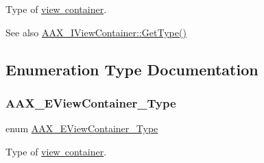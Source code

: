 Type of \mbox{\hyperlink{a01889}{view container}}. 

\begin{DoxySeeAlso}{See also}
\mbox{\hyperlink{a01889_a1715c042ed8412a2135f4d9e5109e8fb}{A\+A\+X\+\_\+\+I\+View\+Container\+::\+Get\+Type()}} 
\end{DoxySeeAlso}


\subsection{Enumeration Type Documentation}
\mbox{\label{a00503_a89d5cb8c7fdb11f34e695fb0e057b764}} 
\subsubsection{\texorpdfstring{AAX\_EViewContainer\_Type}{AAX\_EViewContainer\_Type}}
{\footnotesize\ttfamily enum \mbox{\hyperlink{a00503_a89d5cb8c7fdb11f34e695fb0e057b764}{A\+A\+X\+\_\+\+E\+View\+Container\+\_\+\+Type}}}



Type of \mbox{\hyperlink{a01889}{view container}}. 

